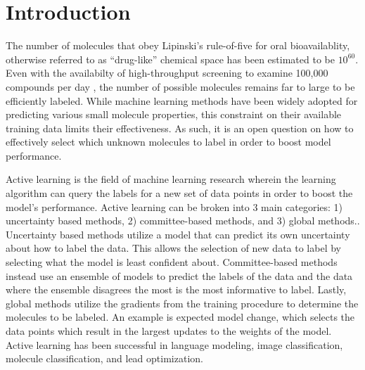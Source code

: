 \documentclass[journal=jmcmar,manuscript=article]{achemso}
\begin{document}

\section{Introduction}

The number of molecules that obey Lipinski's rule-of-five for oral bioavailablity, otherwise referred to as ``drug-like'' chemical space has been estimated to be $10^{60}$. \cite{lipinski1997experimental,bohacekChemSpace} Even with the availabilty of high-throughput screening to examine 100,000 compounds per day \cite{htsnumbers}, the number of possible molecules remains far to large to be efficiently labeled. While machine learning methods have been widely adopted for predicting various small molecule properties, this constraint on their available training data limits their effectiveness. As such, it is an open question on how to effectively select which unknown molecules to label in order to boost model performance.

Active learning is the field of machine learning research wherein the learning algorithm can query the labels for a new set of data points in order to boost the model's performance. Active learning can be broken into 3 main categories: 1) uncertainty based methods, 2) committee-based methods, and 3) global methods.\cite{alreview1,alreview2}. Uncertainty based methods utilize a model that can predict its own uncertainty about how to label the data. This allows the selection of new data to label by selecting what the model is least confident about. Committee-based methods instead use an ensemble of models to predict the labels of the data and the data where the ensemble disagrees the most is the most informative to label. Lastly, global methods utilize the gradients from the training procedure to determine the molecules to be labeled. An example is expected model change, which selects the data points which result in the largest updates to the weights of the model. Active learning has been successful in language modeling\cite{allanguage}, image classification\cite{allanguage}, molecule classification\cite{alcompoundclass}, and lead optimization\cite{alleadop}. 
\end{document}
